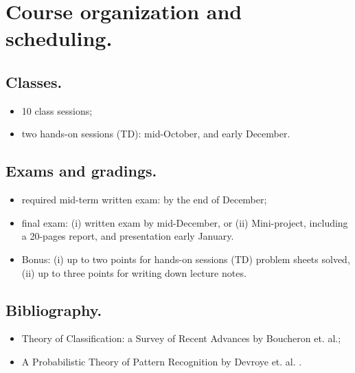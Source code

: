 \appendix

\chapter{Course organization and scheduling.}

		\section{Classes.}
			\begin{itemize}
				\item 10 class sessions;
				\item two hands-on sessions (TD): mid-October, and early December.
			\end{itemize}

		\section{Exams and gradings.}
			\begin{itemize}
				\item required mid-term written exam: by the end of December;
				\item final exam: (i) written exam by mid-December, or (ii) Mini-project, including a 20-pages report, and presentation early January.
				\item Bonus: (i) up to two points for hands-on sessions (TD) problem sheets solved, (ii) up to three points for writing down lecture notes.
			\end{itemize}

		\section{Bibliography.}
			\begin{itemize}
				\item Theory of Classification: a Survey of Recent Advances by Boucheron et. al.\cite{tc_Lugosi};
				\item A Probabilistic Theory of Pattern Recognition by Devroye et. al. \cite{ptpr}.
			\end{itemize}